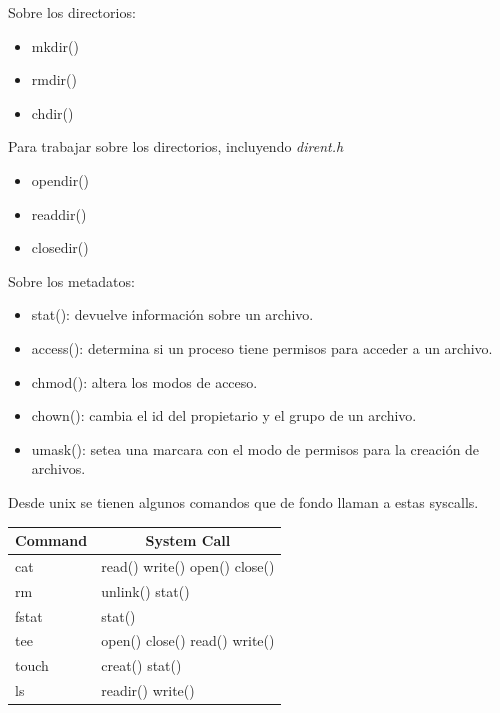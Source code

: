 \documentclass[titlepage,a4paper]{article}
\begin{document}
Sobre los directorios:
\begin{itemize}
    \item mkdir()
    \item rmdir()
    \item chdir()
\end{itemize}

Para trabajar sobre los directorios, incluyendo \emph{dirent.h}
\begin{itemize}
    \item opendir()
    \item readdir()
    \item closedir()
\end{itemize}

Sobre los metadatos:
\begin{itemize}
    \item stat(): devuelve información sobre un archivo.
    \item access(): determina si un proceso tiene permisos para acceder a un archivo.
    \item chmod(): altera los modos de acceso.
    \item chown(): cambia el id del propietario y el grupo de un archivo.
    \item umask(): setea una marcara con el modo de permisos para la creación de archivos.
\end{itemize}

Desde unix se tienen algunos comandos que de fondo llaman a estas syscalls.

\begin{table}[]
\centering
\begin{tabular}{|l|l|}
\hline
\multicolumn{1}{|c|}{Command} & \multicolumn{1}{c|}{System Call} \\ \hline
cat                           & read() write() open() close()    \\ \hline
rm                            & unlink() stat()                  \\ \hline
fstat                         & stat()                           \\ \hline
tee                           & open() close() read() write()    \\ \hline
touch                         & creat() stat()                   \\ \hline
ls                            & readir() write()                 \\ \hline
\end{tabular}
\end{table}
\end{document}
